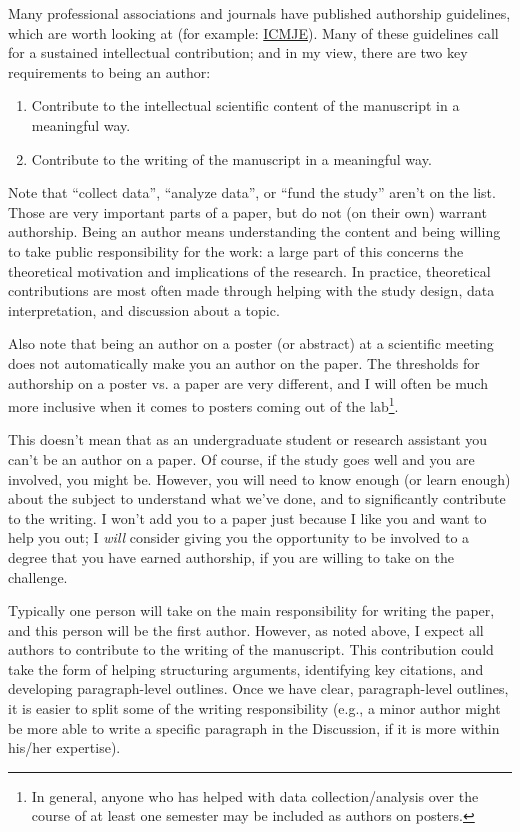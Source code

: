 \documentclass[letterpaper,11pt,oneside]{memoir}
\begin{document}
Many professional associations and journals have published authorship guidelines, which are worth looking at (for example: \href{http://www.icmje.org/recommendations/browse/roles-and-responsibilities/defining-the-role-of-authors-and-contributors.html}{ICMJE}). Many of these guidelines call for a sustained intellectual contribution; and in my view, there are two key requirements to being an author:

\begin{enumerate}
\item Contribute to the intellectual scientific content of the manuscript in a meaningful way.
\item Contribute to the writing of the manuscript in a meaningful way.
\end{enumerate}

Note that ``collect data'', ``analyze data'', or ``fund the study'' aren't on the list. Those are very important parts of a paper, but do not (on their own) warrant authorship. Being an author means understanding the content and being willing to take public responsibility for the work: a large part of this concerns the theoretical motivation and implications of the research. In practice, theoretical contributions are most often made through helping with the study design, data interpretation, and discussion about a topic.

Also note that being an author on a poster (or abstract) at a scientific meeting does not automatically make you an author on the paper. The thresholds for authorship on a poster vs. a paper are very different, and I will often be much more inclusive when it comes to posters coming out of the lab\footnote{In general, anyone who has helped with data collection/analysis over the course of at least one semester may be included as authors on posters.}.

This doesn't mean that as an undergraduate student or research assistant you can't be an author on a paper. Of course, if the study goes well and you are involved, you might be. However, you will need to know enough (or learn enough) about the subject to understand what we've done, and to significantly contribute to the writing. I won't add you to a paper just because I like you and want to help you out; I {\itshape will} consider giving you the opportunity to be involved to a degree that you have earned authorship, if you are willing to take on the challenge.

Typically one person will take on the main responsibility for writing the paper, and this person will be the first author. However, as noted above, I expect all authors to contribute to the writing of the manuscript. This contribution could take the form of helping structuring arguments, identifying key citations, and developing paragraph-level outlines. Once we have clear, paragraph-level outlines, it is easier to split some of the writing responsibility (e.g., a minor author might be more able to write a specific paragraph in the Discussion, if it is more within his/her expertise).
\end{document}
